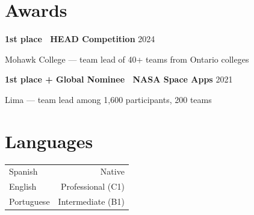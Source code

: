 \documentclass[10pt,letterpaper]{article}
\begin{document}
\begin{minipage}[t]{0.62\linewidth}
  \section*{Awards}
  \footnotesize
  \textbf{1st place \textperiodcentered\ HEAD Competition} \hfill \textcolor{inkmute}{2024}\par
  \textcolor{inkdim}{Mohawk College --- team lead of 40+ teams from Ontario colleges}\par
  \vspace{1pt}
  \textbf{1st place + Global Nominee \textperiodcentered\ NASA Space Apps} \hfill \textcolor{inkmute}{2021}\par
  \textcolor{inkdim}{Lima --- team lead among 1{,}600 participants, 200 teams}
\end{minipage}%
\hfill
\begin{minipage}[t]{0.34\linewidth}
  \section*{Languages}
  \footnotesize
  \noindent\begin{tabularx}{\linewidth}{@{}X r@{}}
    Spanish     & \textcolor{inkmute}{Native} \\
    English     & \textcolor{inkmute}{Professional (C1)} \\
    Portuguese  & \textcolor{inkmute}{Intermediate (B1)} \\
  \end{tabularx}
\end{minipage}
\end{document}
